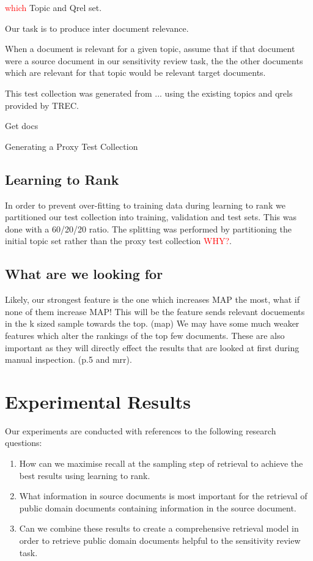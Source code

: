 \documentclass{mpaper}
\newcommand{\remove}[1]{\textcolor{red}{#1}}
\begin{document}
\remove{which} Topic and Qrel set.

Our task is to produce inter document relevance.

When a document is relevant for a given topic, assume that if that document were a source document in our sensitivity review task, the the other documents which are relevant for that topic would be relevant target documents.

This test collection was generated from ... using the existing topics and qrels provided by TREC.

\begin{algorithm}
\SetAlgoLined
{}
 Get docs\;
 \caption{Generating a Proxy Test Collection}
\end{algorithm}

\subsection{Learning to Rank}
In order to prevent over-fitting to training data during learning to rank we partitioned our test collection into training, validation and test sets.
This was done with a 60/20/20 ratio.
The splitting was performed by partitioning the initial topic set rather than the proxy test collection \remove{WHY?}.

\subsection{What are we looking for}
Likely, our strongest feature is the one which increases MAP the most, what if none of them increase MAP! This will be the feature sends relevant docuements in the k sized sample towards the top. (map)
We may have some much weaker features which alter the rankings of the top few documents. These are also important as they will directly effect the results that are looked at first during manual inspection. (p.5 and mrr).


\section{Experimental Results} \label{sec:results}
Our experiments are conducted with references to the following research questions:
\begin{enumerate}[label=\textbf{RQ.\arabic*}]
\item How can we maximise recall at the sampling step of retrieval to achieve the best results using learning to rank.
\item What information in source documents is most important for the retrieval of public domain documents containing information in the source document.
\item Can we combine these results to create a comprehensive retrieval model in order to retrieve public domain documents helpful to the sensitivity review task.
\end{enumerate}
\end{document}
